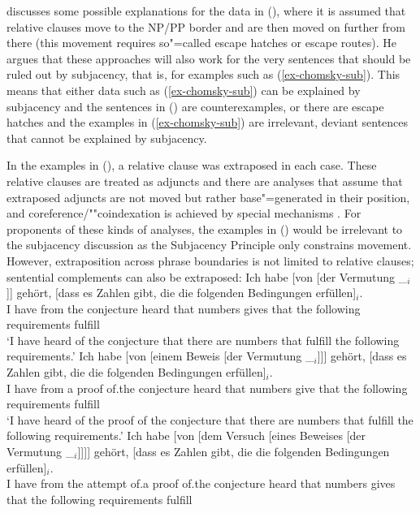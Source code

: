 \citet[--54]{Koster78b-u} discusses some possible explanations for the data in (), where it is assumed that relative clauses move to the NP/PP border and are then
moved on further from there (this movement requires so"=called escape hatches or escape routes). He argues that
these approaches will also work for the very sentences that should be ruled out by subjacency, that is, for examples such as (\ref{ex-chomsky-sub}). This means that either
data such as (\ref{ex-chomsky-sub}) can be explained by subjacency and the sentences in ()  are counterexamples, or there are escape hatches and the examples in
(\ref{ex-chomsky-sub}) are irrelevant, deviant sentences that cannot be explained by subjacency.

\addlines[-1]
In the examples in (), a relative clause was extraposed in each case. These relative clauses
are treated as adjuncts and there are analyses that assume that extraposed adjuncts are not moved but rather base"=generated in their position,
and coreference/""coindexation is achieved by special mechanisms \citep{Kiss2005a}.
For proponents of these kinds of analyses, the examples in () would be irrelevant to the subjacency discussion as the Subjacency Principle
only constrains movement. However, extraposition across phrase boundaries is not limited to relative clauses; sentential complements can also be extraposed:
\eal
\ex 
\gll Ich habe [von [der Vermutung \_$_i$]] gehört, [dass es Zahlen gibt, die die folgenden Bedingungen erfüllen]$_i$.\\
	 I have \spacebr{}from \spacebr{}the conjecture {} heard \spacebr{}that \expl{} numbers gives that the following requirements fulfill\\
\glt `I have heard of the conjecture that there are numbers that fulfill the following requirements.'
\ex 
\gll Ich habe [von [einem Beweis [der Vermutung \_$_i$]]] gehört, [dass es Zahlen gibt, die die folgenden Bedingungen erfüllen]$_i$.\\
	I have \spacebr{}from \spacebr{}a proof \spacebr{}of.the conjecture {} heard \spacebr{}that \expl{} numbers give that the following requirements fulfill\\
\glt `I have heard of the proof of the conjecture that there are numbers that fulfill the following requirements.'
\ex 
\gll Ich habe [von [dem Versuch [eines Beweises [der Vermutung \_$_i$]]]] gehört, [dass es Zahlen gibt, die die folgenden Bedingungen erfüllen]$_i$.\\
	I have \spacebr{}from \spacebr{}the attempt \spacebr{}of.a proof \spacebr{}of.the conjecture {} heard \spacebr{}that \expl{} numbers gives that the following requirements fulfill\\
